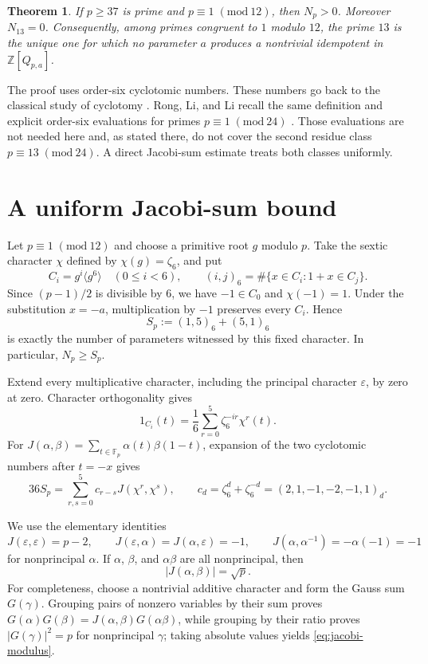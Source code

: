 \documentclass[11pt]{article}
\newtheorem{theorem}{Theorem}
\newcommand{\Fp}{\mathbb F_p}
\newcommand{\eps}{\varepsilon}
\begin{document}
\begin{theorem}\label{thm:main}
If $p\geq37$ is prime and $p\equiv1\;(\mathrm{mod}\ 12)$, then $N_p>0$.
Moreover $N_{13}=0$.  Consequently, among primes congruent to $1$ modulo
$12$, the prime $13$ is the unique one for which no parameter $a$ produces a
nontrivial idempotent in $\mathbb Z[Q_{p,a}]$.
\end{theorem}

The proof uses order-six cyclotomic numbers.  These numbers go back to the
classical study of cyclotomy \cite{Dickson1935}.  Rong, Li, and Li recall the
same definition and explicit order-six evaluations for primes
$p\equiv1\;(\mathrm{mod}\ 24)$ \cite[Section~2]{RongLiLi2023}.  Those evaluations are
not needed here and, as stated there, do not cover the second residue class
$p\equiv13\;(\mathrm{mod}\ 24)$.  A direct Jacobi-sum estimate treats both classes
uniformly.

\section{A uniform Jacobi-sum bound}

Let $p\equiv1\;(\mathrm{mod}\ 12)$ and choose a primitive root $g$ modulo $p$.
Take the sextic character $\chi$ defined by $\chi(g)=\zeta_6$, and put
\[
 C_i=g^i\langle g^6\rangle\quad(0\leq i<6),\qquad
 (i,j)_6=\#\{x\in C_i:1+x\in C_j\}.
\]
Since $(p-1)/2$ is divisible by $6$, we have $-1\in C_0$ and
$\chi(-1)=1$.  Under the substitution $x=-a$, multiplication by $-1$
preserves every $C_i$.  Hence
\[
 S_p:=(1,5)_6+(5,1)_6
\]
is exactly the number of parameters witnessed by this fixed character.  In
particular, $N_p\geq S_p$.

Extend every multiplicative character, including the principal character
$\eps$, by zero at zero.  Character orthogonality gives
\[
 1_{C_i}(t)=\frac16\sum_{r=0}^{5}\zeta_6^{-ir}\chi^r(t).
\]
For $J(\alpha,\beta)=\sum_{t\in\Fp}\alpha(t)\beta(1-t)$, expansion of the
two cyclotomic numbers after $t=-x$ gives
\begin{equation}\label{eq:expansion}
 36S_p=\sum_{r,s=0}^{5}c_{r-s}J(\chi^r,\chi^s),
 \qquad
 c_d=\zeta_6^d+\zeta_6^{-d}=(2,1,-1,-2,-1,1)_d.
\end{equation}

We use the elementary identities
\[
 J(\eps,\eps)=p-2,\qquad
 J(\eps,\alpha)=J(\alpha,\eps)=-1,\qquad
 J(\alpha,\alpha^{-1})=-\alpha(-1)=-1
\]
for nonprincipal $\alpha$.  If $\alpha$, $\beta$, and $\alpha\beta$ are all
nonprincipal, then
\begin{equation}\label{eq:jacobi-modulus}
 |J(\alpha,\beta)|=\sqrt p.
\end{equation}
For completeness, choose a nontrivial additive character and form the Gauss
sum $G(\gamma)$.  Grouping pairs of nonzero variables by their sum proves
$G(\alpha)G(\beta)=J(\alpha,\beta)G(\alpha\beta)$, while grouping by their
ratio proves $|G(\gamma)|^2=p$ for nonprincipal $\gamma$; taking absolute
values yields \eqref{eq:jacobi-modulus}.
\end{document}
